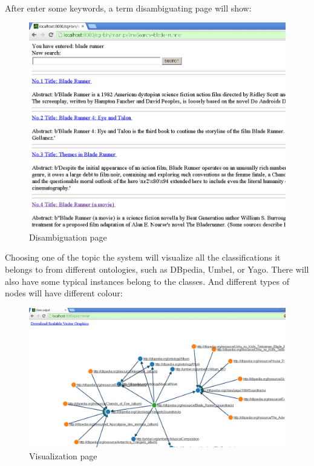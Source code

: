 \documentclass[12pt]{cls}
\begin{document}
\begin{center}
~\\
\end{center}

After enter some keywords, a term disambiguating page will show:

\begin{figure}[H]
\centering
\includegraphics[width=\textwidth]{figures/page2.png}
\caption{Disambiguation page}
\label{Disambiguating page}
\end{figure}

Choosing one of the topic the system will visualize all the classifications it belongs to from different ontologies, such as DBpedia, Umbel, or Yago. There will also have some typical instances belong to the classes. And different types of nodes will have different colour:

\begin{figure}[H]
\centering
\includegraphics[width=\textwidth]{figures/page3.png}
\caption{Visualization page}
\label{Visualization page}
\end{figure}
\end{document}
